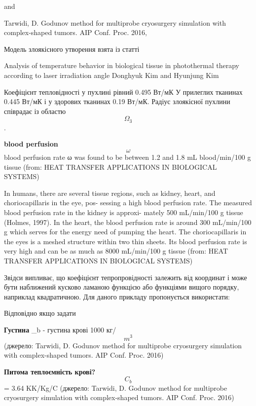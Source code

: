 and

Tarwidi, D. Godunov method for multiprobe cryosurgery simulation with complex-shaped tumors. AIP Conf. Proc. 2016,

Модель злоякісного утворення взята із статті

Analysis of temperature behavior in biological tissue in photothermal therapy according
to laser irradiation angle
Donghyuk Kim and Hyunjung Kim

Коефіцієнт тепловідності у пухлині рівний 0.495 Вт/мК
У прилеглих тканинах 0.445 Вт/мК і у здорових тканинах 0.19 Вт/мК.
Радіус злоякісної пухлини співрадає із областю $$\Omega_3$$.

\textbf{blood perfusion} $$\omega$$ blood perfusion rate ω was found to be between 1.2 and 1.8 mL
blood/min/100 g tissue (from: HEAT TRANSFER APPLICATIONS IN BIOLOGICAL SYSTEMS)

In humans, there are several tissue regions, such as kidney, heart, and choriocapillaris in the eye, pos-
sessing a high blood perfusion rate. The measured blood perfusion rate in the kidney is approxi-
mately 500 mL/min/100 g tissue (Holmes, 1997). In the heart, the blood perfusion rate is around
300 mL/min/100 g which serves for the energy need of pumping the heart. The choriocapillaris in
the eyes is a meshed structure within two thin sheets. Its blood perfusion rate is very high and can
be as much as 8000 mL/min/100 g tissue (from: HEAT TRANSFER APPLICATIONS IN BIOLOGICAL SYSTEMS)

Звідси випливає, що коефіцієнт тепропровідності залежить від координат і може бути наближений кусково ламаною функцією 
або функціями вищого порядку, наприклад квадратичною. Для даного прикладу пропонується використати:



Відповідно якщо задати 

\textbf{Густина} \rho_b - густина крові 1000 кг/$$m^3$$ (джерело: Tarwidi, D. Godunov method for multiprobe cryosurgery 
simulation with complex-shaped tumors. AIP Conf. Proc. 2016)

\textbf{Питома теплоємність крові?} $$C_b$$ = 3.64 KK/Kg/C (джерело: Tarwidi, D. Godunov method for multiprobe cryosurgery 
simulation with complex-shaped tumors. AIP Conf. Proc. 2016)

